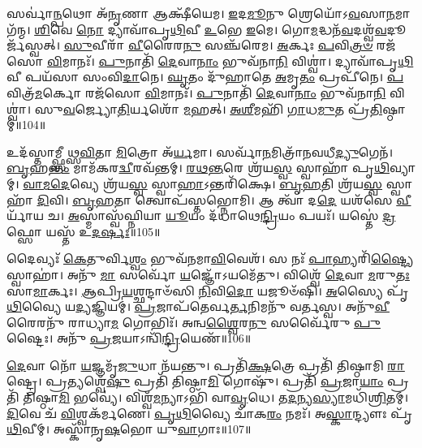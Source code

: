 𑌸𑌰𑍍𑌵𑌾॑\-\ul{𑌨𑍍𑌪}\-𑌥𑍋 𑌅᳴\-\ul{𑌨𑍃}\-𑌣𑌾 𑌆𑌕𑍍𑌷𑍀᳴𑌯𑍇𑌮।
\-\ul{𑌇}\-𑌦\-\ul{𑌮𑍂}\-𑌨𑍁 𑌶𑍍𑌰𑍇𑌯𑍋᳴\-𑌽\-\ul{𑌵}\-𑌸𑌾\-\ul{𑌨}\-𑌮𑌾 𑌗᳴𑌨𑍍𑌮।
\-\ul{𑌶𑌿}\-𑌵𑍇 \ul{𑌨𑍋} 𑌦𑍍𑌯𑌾𑌵𑌾᳴𑌪𑍃\-\ul{𑌥𑌿}\-𑌵𑍀 \ul{𑌉}\-𑌭𑍇 \ul{𑌇}\-𑌮𑍇।
𑌗𑍋\-\ul{𑌮}\-𑌦𑍍𑌧𑌨᳴\-\ul{𑌵}\-𑌦𑌶𑍍𑌵᳴\-\ul{𑌵}\-𑌦𑍂𑌰𑍍𑌜᳴𑌸𑍍𑌵𑌤𑍍।
\-\ul{𑌸𑍁}\-𑌵𑍀𑌰𑌾᳴ \ul{𑌵𑍀}\-𑌰𑍈𑌰\-\ul{𑌨𑍁}\- 𑌸𑌞𑍍𑌚᳴𑌰𑍇𑌮।
\-\ul{𑌅}\-𑌰𑍍𑌕𑌃 \ul{𑌪}\-𑌵𑌿\-\ul{𑌤𑍍𑌰}\-\-\ul{𑍞} 𑌰𑌜᳴𑌸𑍋 \ul{𑌵𑌿}\-𑌮𑌾𑌨𑌃᳴।
\-\ul{𑌪𑍁}\-𑌨𑌾𑌤𑌿᳴ \ul{𑌦𑍇}\-𑌵𑌾\-\ul{𑌨𑌾𑌂} 𑌭𑍁𑌵᳴𑌨𑌾\-\ul{𑌨𑌿} 𑌵𑌿𑌶𑍍𑌵𑌾॑।
𑌦𑍍𑌯𑌾𑌵𑌾᳴𑌪𑍃\-\ul{𑌥𑌿}\-𑌵𑍀 𑌪𑌯᳴𑌸𑌾 𑌸𑌂𑌵𑌿\-\ul{𑌦𑌾}\-𑌨𑍇।
\-\ul{𑌘𑍃}\-𑌤𑌂 𑌦𑍁᳴𑌹𑌾𑌤𑍇 \ul{𑌅}\-𑌮𑍃\-\ul{𑌤𑌂} 𑌪𑍍𑌰𑌪𑍀᳴𑌨𑍇।
\-\ul{𑌪}\-𑌵𑌿𑌤𑍍𑌰᳴\-\ul{𑌮}\-𑌰𑍍𑌕𑍋 𑌰𑌜᳴𑌸𑍋 \ul{𑌵𑌿}\-𑌮𑌾𑌨𑌃᳴।
\-\ul{𑌪𑍁}\-𑌨𑌾𑌤𑌿᳴ \ul{𑌦𑍇}\-𑌵𑌾\-\ul{𑌨𑌾𑌂} 𑌭𑍁𑌵᳴𑌨𑌾\-\ul{𑌨𑌿} 𑌵𑌿𑌶𑍍𑌵𑌾॑।
𑌸𑍁\-\ul{𑌵}\-𑌰𑍍𑌜𑍍𑌯𑍋\-\ul{𑌤𑌿}\-𑌰𑍍𑌯𑌶𑍋᳴ \ul{𑌮}\-𑌹𑌤𑍍।
\-\ul{𑌅}\-\-\ul{𑌶𑍀}\-𑌮𑌹𑌿᳴ \ul{𑌗𑌾}\-𑌧\-\ul{𑌮𑍁}\-𑌤 𑌪𑍍𑌰᳴\-\ul{𑌤𑌿}\-𑌷𑍍𑌠𑌾𑌮𑍍॥104॥\anuvakamend[\-\ul{𑌚𑌾}\-\-\ul{𑌤}\-\-\ul{𑌯}\-\-\ul{𑌤} \ul{𑌶𑍍𑌰𑍀}\-\-\ul{𑌣𑍀}\-\-\ul{𑌤𑌾}\-\-\ul{𑍞} \ul{𑌸}\-𑌤𑍍𑌯\-\ul{𑌮𑌾}\-𑌹𑍁𑌰᳴𑌶𑍀𑌮𑌹𑌿 \ul{𑌗}\-𑌣𑍇 𑌕𑍁᳴𑌰𑍁 \ul{𑌵𑌿}\-𑌦𑍍𑌰𑌵᳴𑌣𑍇 𑌪𑌿\-\ul{𑌤𑍃}\-𑌯𑌾𑌣𑌾᳴ \ul{𑌅}\-𑌰𑍍𑌕𑍋 𑌰𑌜᳴𑌸𑍋 \ul{𑌵𑌿}\-𑌮𑌾\-\ul{𑌨}\-𑌸𑍍𑌤𑍍𑌰𑍀𑌣𑌿᳴ 𑌚]

𑌉𑌦᳴𑌸𑍍𑌤𑌾𑌮𑍍𑌫𑍍𑌸𑍀𑌥𑍍𑌸\-\ul{𑌵𑌿}\-𑌤𑌾 \ul{𑌮𑌿}\-𑌤𑍍𑌰𑍋 𑌅᳴\-\ul{𑌰𑍍𑌯}\-𑌮𑌾।
𑌸𑌰𑍍𑌵𑌾᳴\-\ul{𑌨}\-𑌮𑌿𑌤𑍍𑌰𑌾᳴𑌨\-𑌵𑌧𑍀\-\ul{𑌦𑍍𑌯𑍁}\-𑌗𑍇𑌨᳴।
\-\ul{𑌬𑍃}\-𑌹\-\ul{𑌨𑍍𑌤𑌂} 𑌮𑌾𑌮᳴𑌕𑌰\-\ul{𑌦𑍍𑌵𑍀}\-𑌰𑌵᳴𑌨𑍍𑌤𑌮𑍍।
\-\ul{𑌰}\-\-\ul{𑌥}\-\-\ul{𑌨𑍍𑌤}\-𑌰𑍇 𑌶𑍍𑌰᳴𑌯\-\ul{𑌸𑍍𑌵} 𑌸𑍍𑌵𑌾𑌹𑌾᳴ 𑌪𑍃\-\ul{𑌥𑌿}\-𑌵𑍍𑌯𑌾𑌮𑍍।
\-\ul{𑌵𑌾}\-\-\ul{𑌮}\-\-\ul{𑌦𑍇}\-𑌵𑍍𑌯𑍇 𑌶𑍍𑌰᳴𑌯\-\ul{𑌸𑍍𑌵} 𑌸𑍍𑌵𑌾\-\ul{𑌹𑌾}\-\-𑌽𑌨𑍍𑌤𑌰𑌿᳴𑌕𑍍𑌷𑍇।
\-\ul{𑌬𑍃}\-\-\ul{𑌹}\-𑌤𑌿 𑌶𑍍𑌰᳴𑌯\-\ul{𑌸𑍍𑌵} 𑌸𑍍𑌵𑌾𑌹𑌾᳴ \ul{𑌦𑌿}\-𑌵𑌿।
\-\ul{𑌬𑍃}\-\-\ul{𑌹}\-𑌤𑌾 𑌤𑍍𑌵𑍋𑌪᳴𑌸𑍍𑌤𑌭𑍍𑌨𑍋𑌮𑌿।
𑌆 𑌤𑍍𑌵𑌾᳴ 𑌦\-\ul{𑌦𑍇} 𑌯𑌶᳴𑌸𑍇 \ul{𑌵𑍀}\-𑌰𑍍𑌯𑌾᳴𑌯 𑌚।
\-\ul{𑌅}\-𑌸𑍍𑌮𑌾𑌸𑍍𑌵᳴𑌘𑍍𑌨𑌿𑌯𑌾 \ul{𑌯𑍂}\-𑌯𑌂 𑌦᳴𑌧𑌾𑌥𑍇\-\ul{𑌨𑍍𑌦𑍍𑌰𑌿}\-𑌯𑌂 𑌪𑌯𑌃᳴।
𑌯𑌸𑍍𑌤𑍇॑ \ul{𑌦𑍍𑌰}\-𑌫𑍍𑌸𑍋 𑌯𑌸𑍍𑌤᳴ 𑌉\-\ul{𑌦}\-\-\ul{𑌰𑍍}\-𑌷𑌃॥105॥

𑌦𑍈𑌵𑍍𑌯𑌃᳴ \ul{𑌕𑍇}\-𑌤𑍁𑌰𑍍𑌵𑌿\-\ul{𑌶𑍍𑌵𑌂} 𑌭𑍁𑌵᳴𑌨𑌮𑌾\-\ul{𑌵𑌿}\-𑌵𑍇𑌶᳴।
𑌸 𑌨𑌃᳴ \ul{𑌪𑌾}\-𑌹𑍍𑌯𑌰𑌿᳴\-\ul{𑌷𑍍𑌟𑍍𑌯𑍈} 𑌸𑍍𑌵𑌾𑌹𑌾॑।
𑌅𑌨𑍁᳴ \ul{𑌮𑌾} 𑌸𑌰𑍍𑌵𑍋᳴ \ul{𑌯}\-𑌜𑍍𑌞𑍋᳴\-𑌽𑌯𑌮𑍇᳴𑌤𑍁।
𑌵𑌿𑌶𑍍𑌵𑍇᳴ \ul{𑌦𑍇}\-𑌵𑌾 \ul{𑌮}\-𑌰𑍁\-\ul{𑌤𑌃} 𑌸𑌾\-\ul{𑌮𑌾}\-𑌰𑍍𑌕𑌃।
\-\ul{𑌆}\-𑌪𑍍𑌰𑌿\-\ul{𑌯}\-𑌶𑍍𑌛𑌨𑍍𑌦𑌾𑍞᳴𑌸𑌿 \ul{𑌨𑌿}\-𑌵𑌿\-\ul{𑌦𑍋} 𑌯𑌜𑍂𑍞᳴𑌷𑌿।
\-\ul{𑌅}\-𑌸𑍍𑌯𑍈 𑌪𑍃᳴\-\ul{𑌥𑌿}\-𑌵𑍍𑌯𑍈 𑌯\-\ul{𑌦𑍍𑌯}\-𑌜𑍍𑌞𑌿𑌯𑌮𑍍॑।
\-\ul{𑌪𑍍𑌰}\-𑌜𑌾𑌪᳴𑌤𑍇𑌰𑍍𑌵\-\ul{𑌰𑍍𑌤}\-𑌨𑌿𑌮𑌨𑍁᳴ 𑌵𑌰𑍍𑌤𑌸𑍍𑌵।
𑌅𑌨𑍁᳴\-\ul{𑌵𑍀}\-𑌰𑍈𑌰𑌨𑍁᳴ 𑌰𑌾𑌧𑍍𑌯𑌾\-\ul{𑌮} 𑌗𑍋𑌭𑌿𑌃᳴।
𑌅𑌨𑍍𑌵\-\ul{𑌶𑍍𑌵𑍈}\-𑌰\-\ul{𑌨𑍁}\- 𑌸𑌰𑍍𑌵𑍈᳴𑌰𑍁 \ul{𑌪𑍁}\-𑌷𑍍𑌟𑍈𑌃।
𑌅𑌨𑍁᳴ \ul{𑌪𑍍𑌰}\-𑌜𑌯𑌾\-𑌽𑌨𑍍𑌵𑌿᳴\-\ul{𑌨𑍍𑌦𑍍𑌰𑌿}\-𑌯𑍇𑌣᳴॥106॥

\-\ul{𑌦𑍇}\-𑌵𑌾 𑌨𑍋᳴ \ul{𑌯}\-𑌜𑍍𑌞𑌮𑍃᳴\-\ul{𑌜𑍁}\-𑌧𑌾 𑌨᳴𑌯𑌨𑍍𑌤𑍁।
𑌪𑍍𑌰𑌤𑌿᳴\-\-\ul{𑌕𑍍𑌷}\-𑌤𑍍𑌰𑍇 𑌪𑍍𑌰𑌤𑌿᳴ 𑌤𑌿𑌷𑍍𑌠𑌾𑌮𑌿 \ul{𑌰𑌾}\-𑌷𑍍𑌟𑍍𑌰𑍇।
𑌪𑍍𑌰𑌤𑍍𑌯𑌶𑍍𑌵𑍇᳴\-\ul{𑌷𑍁} 𑌪𑍍𑌰𑌤𑌿᳴ 𑌤𑌿𑌷𑍍𑌠𑌾\-\ul{𑌮𑌿} 𑌗𑍋𑌷𑍁᳴।
𑌪𑍍𑌰𑌤𑌿᳴ \ul{𑌪𑍍𑌰}\-𑌜𑌾\-\ul{𑌯𑌾𑌂} 𑌪𑍍𑌰𑌤𑌿᳴ 𑌤𑌿𑌷𑍍𑌠𑌾\-\ul{𑌮𑌿} 𑌭𑌵𑍍𑌯𑍇॑।
𑌵𑌿𑌶𑍍𑌵᳴\-\ul{𑌮}\-𑌨𑍍𑌯𑌾𑌽𑌭𑌿᳴ 𑌵𑌾\-\ul{𑌵𑍃}\-𑌧𑍇।
𑌤\-\ul{𑌦}\-𑌨𑍍𑌯\-\ul{𑌸𑍍𑌯𑌾}\-𑌮𑌧𑌿᳴\-\ul{𑌶𑍍𑌰𑌿}\-𑌤𑌮𑍍।
\-\ul{𑌦𑌿}\-𑌵𑍇 𑌚᳴ \ul{𑌵𑌿}\-𑌶𑍍𑌵𑌕᳴𑌰𑍍𑌮𑌣𑍇।
\-\ul{𑌪𑍃}\-\-\ul{𑌥𑌿}\-𑌵𑍍𑌯𑍈 𑌚𑌾᳴𑌕\-\ul{𑌰𑌂} 𑌨𑌮𑌃᳴।
𑌅\-\ul{𑌸𑍍𑌕𑌾}\-𑌨𑍍𑌦𑍍𑌯𑍗𑌃 𑌪𑍃᳴\-\ul{𑌥𑌿}\-𑌵𑍀𑌮𑍍।
𑌅𑌸𑍍𑌕𑌾᳴𑌨𑍃\-\ul{𑌷}\-𑌭𑍋 𑌯𑍁\-\ul{𑌵𑌾}\-𑌗𑌾𑌃॥107॥


